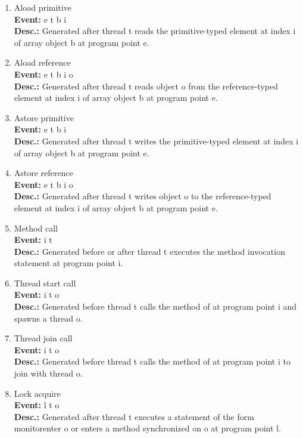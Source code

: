 \begin{enumerate}
\item
Aload primitive \\
{\bf Event:}  e t b i \\
{\bf Desc.:} Generated after thread t reads the primitive-typed element at index i of array object b at program point e.

\item
Aload reference \\
{\bf Event:}  e t b i o \\
{\bf Desc.:} Generated after thread t reads object o from the reference-typed element at index i of array object b at program point e.

\item
Astore primitive \\
{\bf Event:}  e t b i \\
{\bf Desc.:} Generated after thread t writes the primitive-typed element at index i of array object b at program point e.

\item
Astore reference \\
{\bf Event:}  e t b i o \\
{\bf Desc.:} Generated after thread t writes object o to the reference-typed element at index i of array object b at program point e.

\item
Method call \\
{\bf Event:}  i t \\
{\bf Desc.:} Generated before or after thread t executes the method invocation statement at program point i.

\item
Thread start call \\
{\bf Event:}  i t o \\
{\bf Desc.:} Generated before thread t calls the  method of  at program point i and spawns a thread o. 

\item
Thread join call \\
{\bf Event:}  i t o \\
{\bf Desc.:} Generated before thread t calls the  method of  at program point i to join with thread o.

\item
Lock acquire \\
{\bf Event:}  l t o \\
{\bf Desc.:} Generated after thread t executes a statement of the form monitorenter o or enters a method synchronized on o at program point l.


\end{enumerate}
